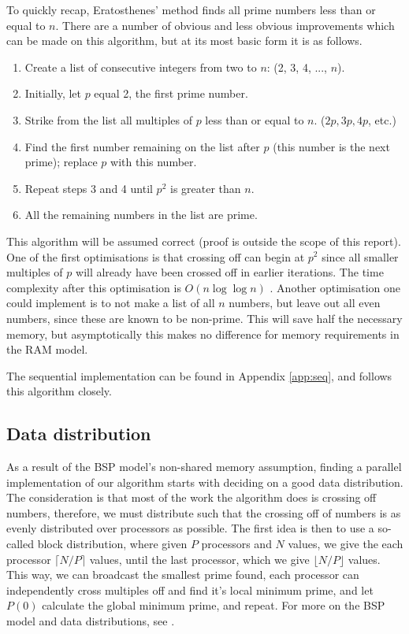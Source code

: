 \documentclass[a4paper]{article}
\begin{document}
To quickly recap, Eratosthenes' method finds all prime numbers less than or
equal to $n$. There are a number of obvious and less
obvious improvements which can be made on this algorithm, but at its most basic
form it is as follows. 

\begin{enumerate}
    \item Create a list of consecutive integers from two to $n$: (2, 3, 4, ...,
        $n$).
    \item Initially, let $p$ equal 2, the first prime number.
    \item Strike from the list all multiples of $p$ less than or equal to $n$.
        ($2p, 3p, 4p$, etc.)
    \item Find the first number remaining on the list after $p$ (this number is
        the next prime); replace $p$ with this number.
    \item Repeat steps 3 and 4 until $p^2$ is greater than $n$.
    \item All the remaining numbers in the list are prime.
\end{enumerate}

This algorithm will be assumed correct (proof is outside the scope of this
report). One of the
first optimisations is that crossing off can begin at $p^2$ since all smaller
multiples of $p$ will already have been crossed off in earlier iterations. The
time complexity after this optimisation is $O(n \log \log n)$ \cite{pp}. Another
optimisation one could implement is to not make a list of all $n$ numbers, but
leave out all even numbers, since these are known to be non-prime. This will
save half the necessary memory, but asymptotically this makes no difference for
memory requirements in the RAM model. 

The sequential implementation can be found in Appendix \ref{app:seq}, and
follows this algorithm closely. 

\subsection{Data distribution}

As a result of the BSP model's non-shared memory assumption,  finding a parallel
implementation of our algorithm starts with deciding on a good data
distribution. The consideration is that most of the work the algorithm does is
crossing off numbers, therefore, we must distribute such that the crossing off
of numbers is as evenly distributed over processors as possible. The first idea
is then to use a so-called block distribution, where given $P$ processors and
$N$ values, we give the each processor $\lceil N/P \rceil$ values, until the
last processor, which we give $\lfloor N/P \rfloor$ values. This way, we can
broadcast the smallest prime found, each processor can independently cross
multiples off and find it's local minimum prime, and let $P(0)$ calculate the
global minimum prime, and repeat. For more on the BSP model and data
distributions, see \cite{biss}.
\end{document}
